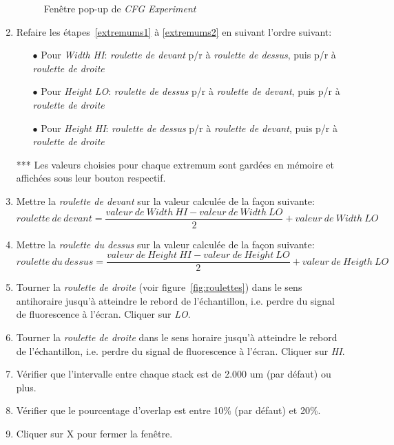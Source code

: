\begin{enumerate}
\begin{figure}[H]
        \caption{Fenêtre pop-up de \textit{CFG Experiment}}
        \label{fig:cf}
        \end{figure}
    \item Refaire les étapes~\ref{extremums1} à \ref{extremums2} en suivant l'ordre suivant:
        \begin{itemize}
        \item[$\bullet$] Pour \textit{Width HI}: \textit{roulette de devant} p/r à \textit{roulette de dessus}, puis p/r à \textit{roulette de droite}
        \item[$\bullet$] Pour \textit{Height LO}: \textit{roulette de dessus} p/r à \textit{roulette de devant}, puis p/r à \textit{roulette de droite}
        \item[$\bullet$] Pour \textit{Height HI}: \textit{roulette de dessus} p/r à \textit{roulette de devant}, puis p/r à \textit{roulette de droite}
        \end{itemize}
    *** Les valeurs choisies pour chaque extremum sont gardées en mémoire et affichées sous leur bouton respectif.
    \item Mettre la \textit{roulette de devant} sur la valeur calculée de la façon suivante:
    $$ roulette~de~devant = \frac{valeur~de~Width~HI - valeur~de~Width~LO}{2} + valeur~de~Width~LO $$
    \item Mettre la \textit{roulette du dessus} sur la valeur calculée de la façon suivante:
    $$ roulette~du~dessus = \frac{valeur~de~Height~HI - valeur~de~Height~LO}{2} + valeur~de~Heigth~LO $$
    \item Tourner la \textit{roulette de droite} (voir figure~\ref{fig:roulettes}) dans le sens antihoraire jusqu'à atteindre le rebord de l'échantillon, i.e. perdre du signal de fluorescence à l'écran. Cliquer sur \textit{LO}.
    \item Tourner la \textit{roulette de droite} dans le sens horaire jusqu'à atteindre le rebord de l'échantillon, i.e. perdre du signal de fluorescence à l'écran. Cliquer sur \textit{HI}.
    \item Vérifier que l'intervalle entre chaque stack est de 2.000 um (par défaut) ou plus.
    \item Vérifier que le pourcentage d'overlap est entre 10\% (par défaut) et 20\%.
    \item Cliquer sur X pour fermer la fenêtre.
\end{enumerate}